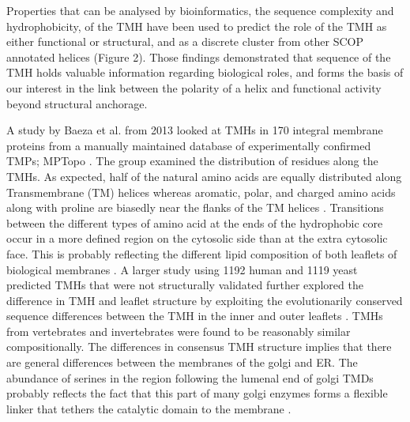 \documentclass[12pt,PhD,twoside]{muthesis}
\begin{document}
Properties that can be analysed by bioinformatics, the sequence complexity and hydrophobicity, of the TMH have been used to predict the role of the TMH as either functional or structural, and as a discrete cluster from other SCOP annotated helices \cite{Wong2012}(Figure 2). Those findings demonstrated that sequence of the TMH holds valuable information regarding biological roles, and forms the basis of our interest in the link between the polarity of a helix and functional activity beyond structural anchorage.

A study by Baeza et al. from 2013 \cite{Baeza-Delgado2013} looked at TMHs in 170 integral membrane proteins from a manually maintained database of experimentally confirmed TMPs; MPTopo \cite{Jayasinghe2001}. The group examined the distribution of residues along the TMHs. As expected, half of the natural amino acids are equally distributed along Transmembrane (TM) helices whereas aromatic, polar, and charged amino acids along with proline are biasedly near the flanks of the TM helices \cite{Baeza-Delgado2013}. Transitions between the different types of amino acid at the ends of the hydrophobic core occur in a more defined region on the cytosolic side than at the extra cytosolic face. This is probably reflecting the different lipid composition of both leaflets of biological membranes \cite{Baeza-Delgado2013}. A larger study using 1192 human and 1119 yeast predicted TMHs that were not structurally validated further explored the difference in TMH and leaflet structure by exploiting the evolutionarily conserved sequence differences between the TMH in the inner and outer leaflets \cite{Sharpe2010}. TMHs from vertebrates and invertebrates were found to be reasonably similar compositionally. The differences in consensus TMH structure implies that there are general differences between the membranes of the golgi and ER. The abundance of serines in the region following the lumenal end of golgi TMDs probably reflects the fact that this part of many golgi enzymes forms a flexible linker that tethers the catalytic domain to the membrane \cite{Sharpe2010}.
\end{document}
